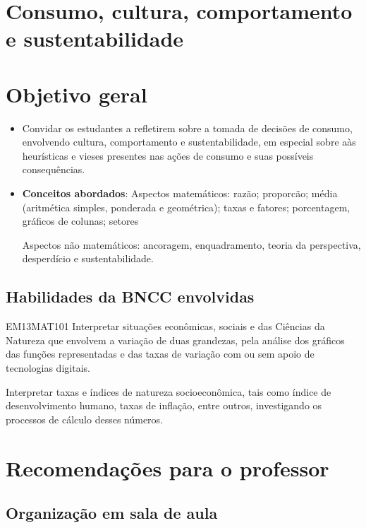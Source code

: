 \begin{paginatexto}\raggedcolumns
\section*{Consumo, cultura, comportamento e sustentabilidade}
\section*{Objetivo geral}

\begin{itemize}
\item Convidar os estudantes a refletirem sobre a tomada de decisões de consumo, envolvendo cultura, comportamento e sustentabilidade, em especial sobre aàs heurísticas e vieses presentes nas ações de consumo e suas possíveis consequências.

\item \textbf{Conceitos abordados}: 
Aspectos matemáticos: razão; proporcão; média (aritmética simples, ponderada e geométrica); taxas e fatores; porcentagem, gráficos de colunas; setores

Aspectos não matemáticos: ancoragem, enquadramento, teoria da perspectiva, desperdício e sustentabilidade.
\end{itemize}

\subsection{Habilidades da BNCC envolvidas}

\begin{habilities}{EM13MAT101}
 Interpretar situações econômicas, sociais e das Ciências da Natureza
que envolvem a variação de duas grandezas, pela análise dos gráficos das funções representadas e das taxas de variação com ou sem apoio de tecnologias digitais.


Interpretar taxas e índices de natureza socioeconômica, tais como índice de desenvolvimento humano, taxas de inflação, entre outros, investigando os processos de cálculo desses números.
\end{habilities}

\section*{Recomendações para o professor}

\subsection{Organização em sala de aula}


\end{paginatexto}
